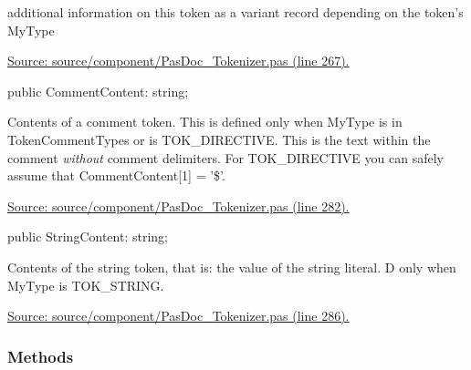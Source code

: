 \documentclass{report}
\newif\ifpdf
\begin{document}
\begin{list}{}
\begin{flushleft}
\ifpdf
\end{flushleft}
\fi


\par additional information on this token as a variant record depending on the token's MyType\par
\href{https://github.com/pasdoc/pasdoc/blob/master/source/component/PasDoc_Tokenizer.pas#L267}{Source: source/component/PasDoc{\_}Tokenizer.pas (line 267).}\label{PasDoc_Tokenizer.TToken-CommentContent}
\item[\textbf{CommentContent}\hfill]
\ifpdf
\begin{flushleft}
\fi
\begin{ttfamily}
public CommentContent: string;\end{ttfamily}

\ifpdf
\end{flushleft}
\fi


\par Contents of a comment token. This is defined only when MyType is in TokenCommentTypes or is TOK{\_}DIRECTIVE. This is the text within the comment \textit{without} comment delimiters. For TOK{\_}DIRECTIVE you can safely assume that CommentContent[1] = '{\$}'.\par
\href{https://github.com/pasdoc/pasdoc/blob/master/source/component/PasDoc_Tokenizer.pas#L282}{Source: source/component/PasDoc{\_}Tokenizer.pas (line 282).}\label{PasDoc_Tokenizer.TToken-StringContent}
\item[\textbf{StringContent}\hfill]
\ifpdf
\begin{flushleft}
\fi
\begin{ttfamily}
public StringContent: string;\end{ttfamily}

\ifpdf
\end{flushleft}
\fi


\par Contents of the string token, that is: the value of the string literal. D only when MyType is TOK{\_}STRING.\par
\href{https://github.com/pasdoc/pasdoc/blob/master/source/component/PasDoc_Tokenizer.pas#L286}{Source: source/component/PasDoc{\_}Tokenizer.pas (line 286).}\end{list}
\subsubsection*{\large{\textbf{Methods}}\normalsize\hspace{1ex}\hfill}
\end{document}
